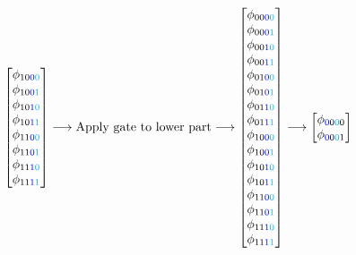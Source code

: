 \documentclass{beamer}
\begin{document}
\begin{frame}
\begin{footnotesize}
\begin{equation}
\begin{bmatrix}
      \phi_{10{\color{blue}0}{\color{cyan}0}} \\
      \phi_{10{\color{blue}0}{\color{cyan}1}} \\
      \phi_{10{\color{blue}1}{\color{cyan}0}}  \\
      \phi_{10{\color{blue}1}{\color{cyan}1}} \\
      \phi_{11{\color{blue}0}{\color{cyan}0}} \\
      \phi_{11{\color{blue}0}{\color{cyan}1}} \\
      \phi_{11{\color{blue}1}{\color{cyan}0}}  \\
      \phi_{11{\color{blue}1}{\color{cyan}1}} \\
    \end{bmatrix} 
\longrightarrow 
     \text{Apply gate to lower part}
\longrightarrow
     \begin{bmatrix} 
      \phi_{00{\color{blue}0}{\color{cyan}0}} \\
      \phi_{00{\color{blue}0}{\color{cyan}1}} \\
      \phi_{00{\color{blue}1}{\color{cyan}0}}  \\
      \phi_{00{\color{blue}1}{\color{cyan}1}} \\
      \phi_{01{\color{blue}0}{\color{cyan}0}} \\
      \phi_{01{\color{blue}0}{\color{cyan}1}} \\
      \phi_{01{\color{blue}1}{\color{cyan}0}}  \\
      \phi_{01{\color{blue}1}{\color{cyan}1}} \\
      \phi_{10{\color{blue}0}{\color{cyan}0}} \\
      \phi_{10{\color{blue}0}{\color{cyan}1}} \\
      \phi_{10{\color{blue}1}{\color{cyan}0}}  \\
      \phi_{10{\color{blue}1}{\color{cyan}1}} \\
      \phi_{11{\color{blue}0}{\color{cyan}0}} \\
      \phi_{11{\color{blue}0}{\color{cyan}1}} \\
      \phi_{11{\color{blue}1}{\color{cyan}0}}  \\
      \phi_{11{\color{blue}1}{\color{cyan}1}} \\
    \end{bmatrix} 
\longrightarrow
        \begin{bmatrix} 
      \phi_{{\color{blue}0}0{\color{cyan}0}0} \\
      \phi_{{\color{blue}0}0{\color{cyan}0}1} \\

\end{bmatrix}
\end{equation}
\end{footnotesize}
\end{frame}
\end{document}
